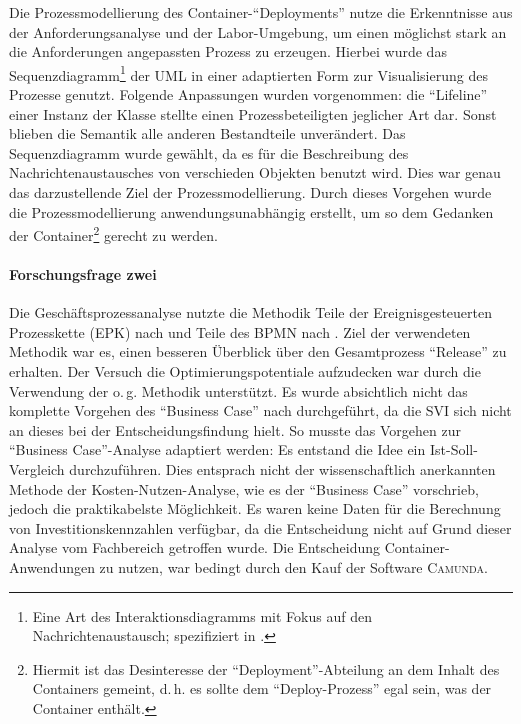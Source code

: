 Die Prozessmodellierung des Container-\enquote{Deployments} nutze die Erkenntnisse aus der Anforderungsanalyse und der Labor-Umgebung, um einen möglichst stark an die Anforderungen angepassten Prozess zu erzeugen. Hierbei wurde das Sequenzdiagramm\footnote{Eine Art des Interaktionsdiagramms mit Fokus auf den Nachrichtenaustausch; spezifiziert in \cite[][S.\,595-599]{object_management_group_omg_unified_2017}.} der \ac{UML} in einer adaptierten Form zur Visualisierung des Prozesse genutzt. Folgende Anpassungen wurden vorgenommen: die \enquote{Lifeline} einer Instanz der Klasse stellte einen Prozessbeteiligten jeglicher Art dar. Sonst blieben die Semantik alle anderen Bestandteile unverändert. Das Sequenzdiagramm wurde gewählt, da es für die Beschreibung des Nachrichtenaustausches von verschieden Objekten benutzt wird. Dies war genau das darzustellende Ziel der Prozessmodellierung. Durch dieses Vorgehen wurde die Prozessmodellierung anwendungsunabhängig erstellt, um so dem Gedanken der Container\footnote{Hiermit ist das Desinteresse der \enquote{Deployment}-Abteilung an dem Inhalt des Containers gemeint, d.\,h. es sollte dem  \enquote{Deploy-Prozess} egal sein, was der Container enthält.} gerecht zu werden. 

\paragraph{Forschungsfrage zwei}
Die Geschäftsprozessanalyse nutzte die Methodik Teile der Ereignisgesteuerten Prozesskette (\acs{EPK}) nach \cite{scheer_objektorientierte_1997} und Teile des \ac{BPMN} nach \cite{object_management_group_omg_business_2011}. Ziel der verwendeten Methodik war es, einen besseren Überblick über den Gesamtprozess \enquote{Release} zu erhalten. Der Versuch die Optimierungspotentiale aufzudecken war durch die Verwendung der o.\,g. Methodik unterstützt. Es wurde absichtlich nicht das komplette Vorgehen des \enquote{Business Case} nach \cite{brugger_it_2009} durchgeführt, da die \ac{SVI} sich nicht an dieses bei der Entscheidungsfindung hielt. So musste das Vorgehen zur \enquote{Business Case}-Analyse adaptiert werden: Es entstand die Idee ein Ist-Soll-Vergleich durchzuführen. Dies entsprach nicht der wissenschaftlich anerkannten Methode der Kosten-Nutzen-Analyse, wie es der \enquote{Business Case} vorschrieb, jedoch die praktikabelste Möglichkeit. Es waren keine Daten für die Berechnung von Investitionskennzahlen verfügbar, da die Entscheidung nicht auf Grund dieser Analyse vom Fachbereich getroffen wurde. Die Entscheidung Container-Anwendungen zu nutzen, war bedingt durch den Kauf der Software \textsc{Camunda}. 

